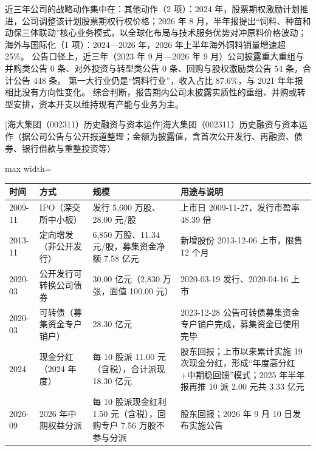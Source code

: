  近三年公司的战略动作集中在：其他动作（2 项）：2024 年，股票期权激励计划推进，公司调整该计划股票期权行权价格；2026 年 8 月，半年报提出“饲料、种苗和动保三体联动”核心业务模式，以全球化布局与技术服务优势对冲原料价格波动；海外与国际化（1 项）：2024---2026 年，2026 年上半年海外饲料销量增速超 25\%。 公告口径上，近三年（2023 年 9 月---2026 年 9 月）公司披露重大重组与并购类公告 0 条、对外投资与转型类公告 0 条、回购与股权激励类公告 54 条，合计公告 448 条。 第一大行业仍是“饲料行业”，收入占比 87.6\%，与 2021 年年报相比没有方向性变化。 综合判断，报告期内公司未披露实质性的重组、并购或转型安排，资本开支以维持现有产能与业务为主。

\begin{center}\small\setlength{\tabcolsep}{4pt}
[海大集团（002311）历史融资与资本运作]{海大集团（002311）历史融资与资本运作（据公司公告与公开报道整理；金额为披露值，含首次公开发行、再融资、债券、银行借款与重整投资等）}
\begin{adjustbox}{max width=\textwidth}
\begin{tabular}{@{}p{1.45cm}p{2.55cm}p{4.05cm}p{4.95cm}@{}}
\toprule
时间 & 方式 & 规模 & 用途与说明 \\
\midrule
2009-11 & IPO（深交所中小板） & 发行 5,\allowbreak{}600 万股、\allowbreak{}28.00 元/\allowbreak{}股 & 上市日 2009-11-27，\allowbreak{}发行市盈率 48.39 倍 \\
2013-11 & 定向增发（非公开发行） & 6,\allowbreak{}850 万股、\allowbreak{}11.34 元/\allowbreak{}股，\allowbreak{}募集资金净额 7.58 亿元 & 新增股份 2013-12-06 上市，\allowbreak{}限售 12 个月 \\
2020-03 & 公开发行可转换公司债券 & 30.00 亿元（2,\allowbreak{}830 万张，\allowbreak{}面值 100.00 元） & 2020-03-19 发行、\allowbreak{}2020-04-16 上市 \\
2020-03 & 可转债（募集资金专户销户） & 28.30 亿元 & 2023-12-28 公告可转债募集资金专户销户完成，\allowbreak{}募集资金已使用完毕 \\
2024 & 现金分红（2024 年度） & 每 10 股派 11.00 元（含税），\allowbreak{}合计派现 18.30 亿元 & 股东回报；上市以来累计实施 19 次现金分红，\allowbreak{}形成“年度高分红+中期稳回馈”模式；2025 年半年报再推 10 派 2.00 元共 3.33 亿元 \\
2026-09 & 2026 年中期权益分派 & 每 10 股派现金红利 1.50 元（含税），\allowbreak{}回购专户 7.56 万股不参与分派 & 股东回报；2026 年 9 月 10 日发布实施公告 \\
\bottomrule
\end{tabular}
\end{adjustbox}
\end{center}

